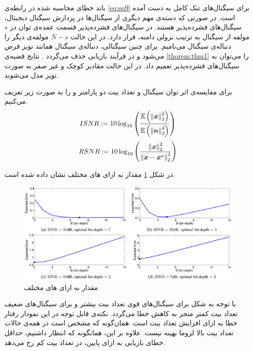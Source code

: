 باند خطای محاسبه شده در رابطه‌ی 
\eqref{eq:eq9}
برای سیگنال‌های تنک کامل به دست آمده است. در صورتی که دسته‌ی مهم دیگری از سیگنال‌ها در پردازش سیگنال دیجیتال، سیگنال‌های فشرده‌پذیر هستند. در سیگنال‌های فشرده‌پذیر قسمت عمده‌ی توان در 
$s$
مولفه از سیگنال به ترتیب نزولی دامنه، قرار دارد. در این حالت 
$N-s$
مولفه‌ی دیگر را دنباله‌ی سیگنال می‌نامیم. برای چنین سیگنالی، دنباله‌ی سیگنال همانند نویز فرض می‌شود و در فرآیند بازیابی حذف می‌گردد
\cite{davenport2012pros,davies2011sample}.
نتایج قضیه‌ی
\ref{thorem:thm1}
را می‌توان به سیگنال‌های فشرده‌پذیر تعمیم داد. در این حالت مقادیر کوچک و غیر صفر به صورت نویز مدل می‌شوند.



برای مقایسه‌ی اثر توان سیگنال و تعداد بیت دو پارامتر 
و
را به صورت زیر تعریف می‌کنیم.
\begin{align}
\label{eq9}
ISNR := 10\log_{10}\left( \dfrac{\mathbb{E}\left( \left\lVert\bm{x}\right\rVert_{2}^{2} \right)}{\mathbb{E}\left( \left\lVert\bm{n}\right\rVert_{2}^{2} \right)} \right)
\end{align}
\begin{align}
\label{eq10}
RSNR := 10\log_{10}\left( \dfrac{\left\lVert\bm{x}\right\rVert_{2}^{2}}{\left\lVert\bm{x}-\bm{x}^{\star}\right\rVert_{2}^{2}} \right)
\end{align}

در شکل
\ref{fig3}
مقدار 
به ازای 
های
مختلف نشان داده شده است.
\begin{figure}[H]
\centering
\includegraphics[scale=0.34]{Images/ch1/fig3.eps}
\caption{مقدار 
به ازای 
های
مختلف\cite{laska2012regime} }
\label{fig3}
\end{figure}

با توجه به شکل برای سیگنال‌های قوی تعداد بیت بیشتر و برای سیگنال‌های ضعیف تعداد بیت کمتر منجر به کاهش خطا می‌گردد.
نکته‌ی قابل توجه در این نمودار رفتار خطا به ازای افزایش تعداد بیت است. همان‌گونه که مشخص است در همه‌ی حالات تعداد بیت بالا لزوما بهینه نیست. علاوه بر این، همانگونه که انتظار داشتیم، حداقل خطای بازیابی به ازای 
پایین، در تعداد بیت کم رخ می‌دهد.

